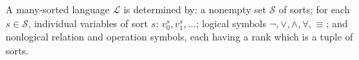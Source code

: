 A many-sorted language $\mathcal{L}$ is determined by: a nonempty set $\mathcal{S}$ of sorts; for each $s \in \mathcal{S}$, individual variables of sort $s$: $v_0^s, v_1^s, \ldots$; logical symbols $\neg, \lor, \land, \forall, \equiv$; and nonlogical relation and operation symbols, each having a rank which is a tuple of sorts.
